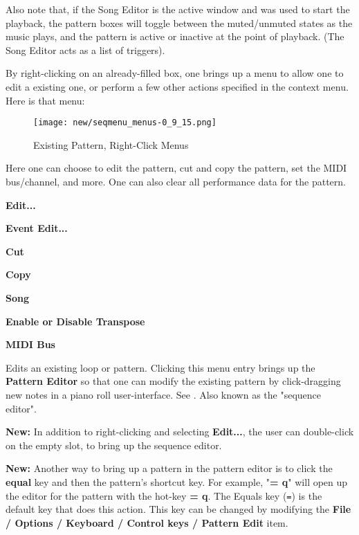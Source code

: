    Also note that, if the Song Editor is the active window and was used to
   start the playback, the pattern boxes will toggle between the muted/unmuted
   states as the music plays, and the pattern is active or inactive at the
   point of playback.  (The Song Editor acts as a list of triggers).

   By right-clicking on an already-filled box, one brings up a menu
   to allow one to edit a existing one, or perform a few other actions
   specified in the context menu.  Here is that menu:

\begin{figure}[H]
   \centering 
   \texttt{[image: new/seqmenu\_menus-0\_9\_15.png]}
   \caption{Existing Pattern, Right-Click Menus}
   \label{fig:pattern_window_right_click}
\end{figure}

   Here one can choose to edit the pattern, cut and copy the pattern,
   set the MIDI bus/channel, and more.
   One can also clear all performance data for the pattern.
   
   \begin{enumber}
      \item \textbf{Edit...}
      \item \textbf{Event Edit...}
      \item \textbf{Cut}
      \item \textbf{Copy}
      \item \textbf{Song}
      \item \textbf{Enable or Disable Transpose}
      \item \textbf{MIDI Bus}
   \end{enumber}

   \setcounter{ItemCounter}{0}      %

   Edits an existing loop or pattern.
   Clicking this menu entry brings up the \textbf{Pattern Editor}
   so that one can modify the existing pattern by click-dragging new notes in a
   piano roll user-interface.
   See .
   Also known as the "sequence editor".

   \textbf{New:}
   In addition to right-clicking and selecting \textbf{Edit...}, the user can
   double-click on the empty slot, to bring up the sequence editor.

   \textbf{New:}
   Another way to bring up a pattern in the pattern editor is to
   click the \textbf{equal} key and then the pattern's shortcut key.
   For example, "\textbf{= q}" will open up the editor for the pattern with the
   hot-key \textbf{= q}.
   The Equals key (\texttt{=}) is the default key that does this action.
   This key can be changed by modifying the
   \textbf{File / Options / Keyboard / Control keys / Pattern Edit} item.

